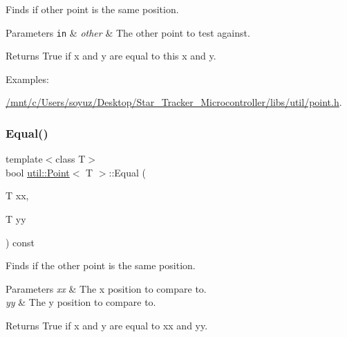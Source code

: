 Finds if other point is the same position. 


\begin{DoxyParams}[1]{Parameters}
\mbox{\tt in}  & {\em other} & The other point to test against. \\
\hline
\end{DoxyParams}
\begin{DoxyReturn}{Returns}
True if x and y are equal to this x and y. 
\end{DoxyReturn}
\begin{Desc}
\item[Examples\+: ]\par
\hyperlink{_2mnt_2c_2Users_2soyuz_2Desktop_2Star_Tracker_Microcontroller_2libs_2util_2point_8h-example}{/mnt/c/\+Users/soyuz/\+Desktop/\+Star\+\_\+\+Tracker\+\_\+\+Microcontroller/libs/util/point.\+h}.\end{Desc}
\mbox{\label{classutil_1_1Point_a291fdc97f84d3271509b9137969749eb}} 
\subsubsection{\texorpdfstring{Equal()}{Equal()}\hspace{0.1cm}{\footnotesize\ttfamily [2/2]}}
{\footnotesize\ttfamily template$<$class T$>$ \\
bool \hyperlink{classutil_1_1Point}{util\+::\+Point}$<$ T $>$\+::Equal (\begin{DoxyParamCaption}\item[{T}]{xx,  }\item[{T}]{yy }\end{DoxyParamCaption}) const\hspace{0.3cm}{\ttfamily [inline]}}



Finds if the other point is the same position. 


\begin{DoxyParams}{Parameters}
{\em xx} & The x position to compare to. \\
\hline
{\em yy} & The y position to compare to. \\
\hline
\end{DoxyParams}
\begin{DoxyReturn}{Returns}
True if x and y are equal to xx and yy. 
\end{DoxyReturn}
\mbox{\label{classutil_1_1Point_ab5a39259be6edc0a30e2a92bb4b7e526}} 
